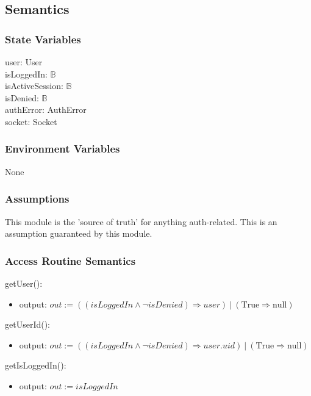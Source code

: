 \documentclass[12pt, titlepage]{article}
\begin{document}
\subsection{Semantics}

\subsubsection{State Variables}

user: User  \\
isLoggedIn: $\mathbb{B}$ \\
isActiveSession: $\mathbb{B}$ \\
isDenied: $\mathbb{B}$ \\
authError: AuthError \\
socket: Socket \\

\subsubsection{Environment Variables}

None

\subsubsection{Assumptions}

This module is the 'source of truth' for anything auth-related. This is an assumption guaranteed by this module.

\subsubsection{Access Routine Semantics}

\noindent getUser():
\begin{itemize}
\item output: $out := ((isLoggedIn \land \lnot isDenied) \Rightarrow user) \ | \ (\text{True} \Rightarrow \text{null})$
\end{itemize}

\noindent getUserId():
\begin{itemize}
\item output: $out := ((isLoggedIn \land \lnot isDenied) \Rightarrow user.uid) \ | \ (\text{True} \Rightarrow \text{null})$
\end{itemize}

\noindent getIsLoggedIn():
\begin{itemize}
\item output: $out := isLoggedIn$
\end{itemize}
\end{document}
